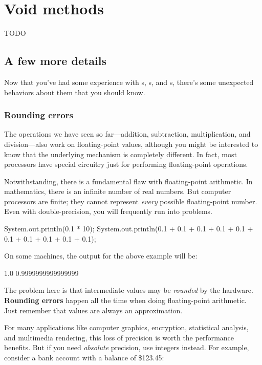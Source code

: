 \chapter{Void methods}

TODO


\section{A few more details}

Now that you've had some experience with s, s, and s, there's some unexpected behaviors about them that you should know.

\subsection{Rounding errors}


The operations we have seen so far---addition, subtraction, multiplication, and division---also work on floating-point values, although you might be interested to know that the underlying mechanism is completely different.
In fact, most processors have special circuitry just for performing floating-point operations.

Notwithstanding, there is a fundamental flaw with floating-point arithmetic.
In mathematics, there is an infinite number of real numbers.
But computer processors are finite; they cannot represent {\em every} possible floating-point number.
Even with double-precision, you will frequently run into problems.

\begin{code}
    System.out.println(0.1 * 10);
    System.out.println(0.1 + 0.1 + 0.1 + 0.1 + 0.1
                     + 0.1 + 0.1 + 0.1 + 0.1 + 0.1);
\end{code}

On some machines, the output for the above example will be:

\begin{stdout}
    1.0
    0.9999999999999999
\end{stdout}

The problem here is that intermediate values may be {\em rounded} by the hardware.
{\bf Rounding errors} happen all the time when doing floating-point arithmetic.
Just remember that  values are always an approximation.

For many applications like computer graphics, encryption, statistical analysis, and multimedia rendering, this loss of precision is worth the performance benefits.
But if you need {\em absolute} precision, use integers instead.
For example, consider a bank account with a balance of \$123.45:

